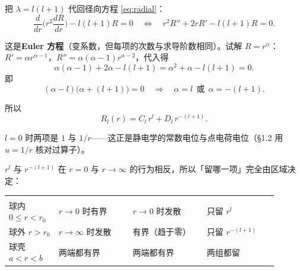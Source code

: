 \label{sec:s5}


把 $\lambda=l(l+1)$ 代回径向方程 \eqref{eq:radial}：
\begin{equation}
\frac{d}{dr}\Big(r^2\frac{dR}{dr}\Big)-l(l+1)R=0
\quad\Longleftrightarrow\quad
r^2R''+2rR'-l(l+1)R=0 .
\label{eq:euler}
\end{equation}

这是\textbf{Euler 方程}（变系数，但每项的次数与求导阶数相同）。试解 $R=r^\alpha$：$R'=\alpha r^{\alpha-1}$，$R''=\alpha(\alpha-1)r^{\alpha-2}$，代入得
\[
\alpha(\alpha-1)+2\alpha-l(l+1)=\alpha^2+\alpha-l(l+1)=0 .
\]
即
\[
(\alpha-l)\big(\alpha+(l+1)\big)=0
\quad\Longrightarrow\quad
\alpha=l\ \ \text{或}\ \ \alpha=-(l+1).
\]

所以
\begin{equation}
R_l(r)=C_l\,r^{l}+D_l\,r^{-(l+1)} .
\label{eq:Rl}
\end{equation}

$l=0$ 时两项是 $1$ 与 $1/r$——这正是静电学的常数电位与点电荷电位（\S1.2 用 $u=1/r$ 核对过算子）。



$r^l$ 与 $r^{-(l+1)}$ 在 $r=0$ 与 $r\to\infty$ 的行为相反，所以「留哪一项」完全由区域决定：

\begin{center}
\tabtop
\begin{tabular}{@{}L{0.16\linewidth}L{0.25\linewidth}L{0.25\linewidth}L{0.24\linewidth}@{}}
 &  &  &  \\
\tabmidrule
球内 $0\le r<r_0$ & $r\to0$ 时有界 & $r\to0$ 时发散 & 只留 $r^l$ \\
球外 $r>r_0$ & $r\to\infty$ 时发散 & 有界（趋于零） & 只留 $r^{-(l+1)}$ \\
球壳 $a<r<b$ & 两端都有界 & 两端都有界 & 两组都留 \\
\end{tabular}
\tabbot
\end{center}

